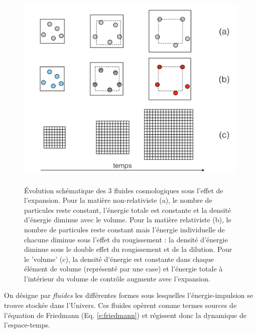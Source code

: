 \begin{figure}[htbp]
	\centering
		\includegraphics[height=10cm]{figs/fluides.png}
	\caption[Évolution des fluides cosmologiques]{Évolution schématique des 3 fluides cosmologiques sous l'effet de l'expansion. Pour la matière non-relativiste (a), le nombre de particules reste constant, l'énergie totale est constante et la densité d'énergie diminue avec le volume. Pour la matière relativiste (b), le nombre de particules reste constant mais l'énergie individuelle de chacune diminue sous l'effet du rougissement : la densité d'énergie diminue sous le double effet du rougissement et de la dilution. Pour le 'volume' (c), la densité d'énergie est constante dans chaque élément de volume (représenté par une case) et l'énergie totale à l'intérieur du volume de contrôle augmente avec l'expansion.}
	\label{f:fluides}
\end{figure}

On désigne par \textit{fluides} les différentes formes sous lesquelles l'énergie-impulsion se trouve stockée dans l'Univers. Ces fluides opèrent comme termes  sources de l'équation de Friedmann (Eq. \ref{e:friedmann}) et régissent donc la dynamique de l'espace-temps. 


